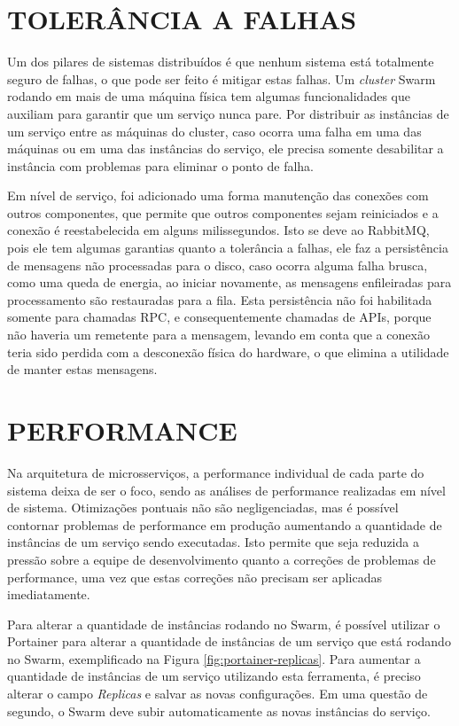 \section{TOLERÂNCIA A FALHAS}

Um dos pilares de sistemas distribuídos é que nenhum sistema está totalmente
seguro de falhas, o que pode ser feito é mitigar estas falhas. Um
\emph{cluster} Swarm rodando em mais de uma máquina física tem algumas
funcionalidades que auxiliam para garantir que um serviço nunca pare. Por
distribuir as instâncias de um serviço entre as máquinas do cluster, caso
ocorra uma falha em uma das máquinas ou em uma das instâncias do serviço, ele
precisa somente desabilitar a instância com problemas para eliminar o ponto de
falha.

Em nível de serviço, foi adicionado uma forma manutenção das conexões com
outros componentes, que permite que outros componentes sejam reiniciados e
a conexão é reestabelecida em alguns milissegundos. Isto se deve ao RabbitMQ,
pois ele tem algumas garantias quanto a tolerância a falhas, ele faz a
persistência de mensagens não processadas para o disco, caso ocorra alguma
falha brusca, como uma queda de energia, ao iniciar novamente, as mensagens
enfileiradas para processamento são restauradas para a fila. Esta persistência
não foi habilitada somente para chamadas \ac{RPC}, e consequentemente
chamadas de \acp{API}, porque não haveria um remetente para a mensagem,
levando em conta que a conexão teria sido perdida com a desconexão física
do hardware, o que elimina a utilidade de manter estas mensagens.

\section{PERFORMANCE}

Na arquitetura de microsserviços, a performance individual de cada parte
do sistema deixa de ser o foco, sendo as análises de performance realizadas
em nível de sistema. Otimizações pontuais não são negligenciadas, mas é
possível contornar problemas de performance em produção aumentando a
quantidade de instâncias de um serviço sendo executadas. Isto permite que
seja reduzida a pressão sobre a equipe de desenvolvimento quanto a correções
de problemas de performance, uma vez que estas correções não precisam ser
aplicadas imediatamente.

Para alterar a quantidade de instâncias rodando no Swarm, é possível utilizar
o Portainer para alterar a quantidade de instâncias de um serviço que está
rodando no Swarm, exemplificado na Figura \ref{fig:portainer-replicas}.
Para aumentar a quantidade de instâncias de um serviço utilizando esta
ferramenta, é preciso alterar o campo \emph{Replicas} e salvar as novas
configurações. Em uma questão de segundo, o Swarm deve subir
automaticamente as novas instâncias do serviço.

